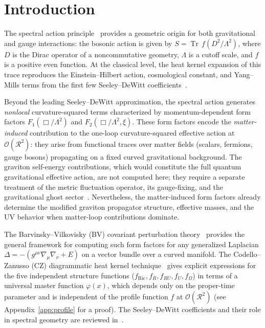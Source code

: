 \documentclass[aps,prd,twocolumn,superscriptaddress,nofootinbib,floatfix]{revtex4-2}
\theoremstyle{definition}
\theoremstyle{remark}
\newcommand{\Tr}{\operatorname{Tr}}
\begin{document}
\maketitle

\section{Introduction}
\label{sec:intro}

The spectral action principle~\cite{Connes:1994yd,Chamseddine:1996zu,Chamseddine:2006ep}
provides a geometric origin for both gravitational and gauge interactions:
the bosonic action is given by $S = \Tr\,f(D^2/\Lambda^2)$, where $D$ is the
Dirac operator of a noncommutative geometry, $\Lambda$ is a cutoff scale, and
$f$ is a positive even function. At the classical level, the heat kernel
expansion of this trace reproduces the Einstein--Hilbert action, cosmological
constant, and Yang--Mills terms from the first few Seeley--DeWitt
coefficients~\cite{Chamseddine:2010ud,vanSuijlekom:2014pya}.

Beyond the leading Seeley--DeWitt approximation, the spectral action generates
\emph{nonlocal} curvature-squared terms characterized by momentum-dependent
form factors $F_1(\Box/\Lambda^2)$ and $F_2(\Box/\Lambda^2,\xi)$. These form
factors encode the \emph{matter-induced} contribution to the one-loop
curvature-squared effective action at $\mathcal{O}(\mathcal{R}^2)$: they arise
from functional traces over matter fields (scalars, fermions, gauge bosons)
propagating on a fixed curved gravitational background. The graviton
self-energy contributions, which would constitute the full quantum gravitational
effective action, are not computed here; they require a separate treatment of
the metric fluctuation operator, its gauge-fixing, and the gravitational ghost
sector~\cite{Stelle:1976gc,Buchbinder:1992rb}. Nevertheless, the matter-induced
form factors already determine the modified graviton propagator structure,
effective masses, and the UV behavior when matter-loop contributions dominate.

The Barvinsky--Vilkovisky (BV) covariant perturbation
theory~\cite{Barvinsky:1985an,Barvinsky:1987uw,Barvinsky:1990up,Barvinsky:2009gw} provides the
general framework for computing such form factors for any generalized Laplacian
$\Delta = -(g^{\mu\nu}\nabla_\mu\nabla_\nu + E)$ on a vector bundle over a
curved manifold. The Codello--Zanusso (CZ) diagrammatic heat kernel
technique~\cite{Codello:2012kq} gives explicit expressions for the five
independent structure functions
($f_{\text{Ric}}, f_R, f_{RU}, f_U, f_\Omega$) in terms of a universal
master function $\varphi(x)$, which depends only on the proper-time parameter
and is independent of the profile function $f$ at
$\mathcal{O}(\mathcal{R}^2)$ (see Appendix~\ref{app:profile} for a proof).
The Seeley--DeWitt coefficients and their role in spectral geometry are
reviewed
in~\cite{DeWitt:1964mxt,Gilkey:1975iq,Vassilevich:2003xt,Avramidi:2000bm,Fursaev:2011zz}.
\end{document}
